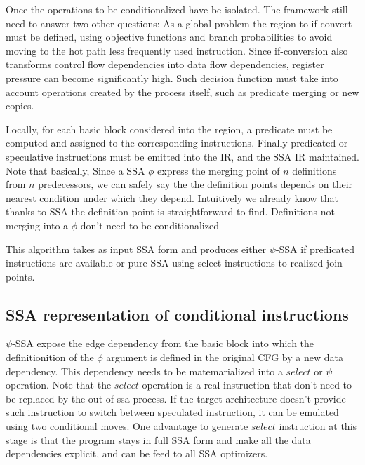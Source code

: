 Once the operations to be conditionalized have be isolated. The framework still need to answer two other questions: As a global problem the region to if-convert must be defined, using objective functions and branch probabilities to avoid moving to the hot path less frequently used instruction. Since if-conversion also transforms control flow dependencies into data flow dependencies, register pressure can become significantly high. Such decision function must take into account operations created by the process itself, such as predicate merging or new copies. 

Locally, for each basic block considered into the region, a predicate must be computed and assigned to the corresponding instructions. Finally predicated or speculative instructions must be emitted into the IR, and the SSA IR maintained. Note that basically, Since a SSA $\phi$ express the merging point of $n$ definitions from $n$ predecessors, we can safely say the the definition points depends on their nearest condition under which they depend. Intuitively we already know that thanks to SSA the definition point is straightforward to find. Definitions not merging into a $\phi$ don't need to be conditionalized

This algorithm takes as input SSA form and produces either $\psi$-SSA if predicated instructions are available or pure SSA using select instructions to realized join points.

\subsection{SSA representation of conditional instructions}

$\psi$-SSA expose the edge dependency from the basic block into which the definitionition of the $\phi$ argument is defined in the original CFG by a new data dependency. This dependency needs to be matemarialized into a $select$ or $\psi$ operation. Note that the $select$ operation is a real instruction that don't need to be replaced by the out-of-ssa process. If the target architecture doesn't provide such instruction to switch between speculated instruction, it can be emulated using two conditional moves. One advantage to generate $select$ instruction at this stage is that the program stays in full SSA form and make all the data dependencies explicit, and can be feed to all SSA optimizers. 

